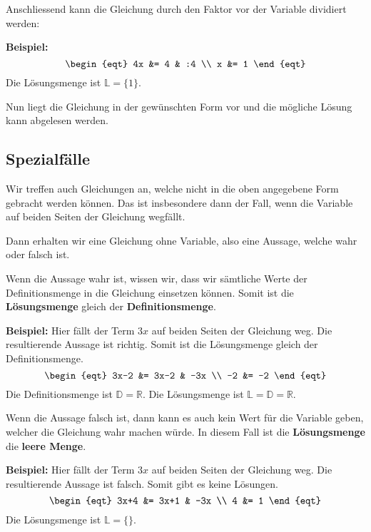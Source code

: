 Anschliessend kann die Gleichung durch den Faktor vor der Variable dividiert werden:

\begin{example}
  \textbf{Beispiel:}
  \[\begin{eqt}
    4x &= 4 & :4 \\
     x &= 1
  \end{eqt}\]
  Die Lösungsmenge ist $\mathbb{L} = \{1\}$.
\end{example}

Nun liegt die Gleichung in der gewünschten Form vor und die mögliche Lösung kann abgelesen werden.

\newpage
\subsection{Spezialfälle}

Wir treffen auch Gleichungen an, welche nicht in die oben angegebene Form gebracht werden können. Das ist insbesondere dann der Fall, wenn die Variable auf beiden Seiten der Gleichung wegfällt.

Dann erhalten wir eine Gleichung ohne Variable, also eine Aussage, welche wahr oder falsch ist.

Wenn die Aussage wahr ist, wissen wir, dass wir sämtliche Werte der Definitionsmenge in die Gleichung einsetzen können. Somit ist die \textbf{Lösungsmenge} gleich der \textbf{Definitionsmenge}.

\begin{example}
  \textbf{Beispiel:} Hier fällt der Term $3x$ auf beiden Seiten der Gleichung weg. Die resultierende Aussage ist richtig. Somit ist die Lösungsmenge gleich der Definitionsmenge.
  \[\begin{eqt}
    3x-2 &= 3x-2 & -3x \\
      -2 &= -2
  \end{eqt}\]
  Die Definitionsmenge ist $\mathbb{D} = \mathbb{R}$. Die Lösungsmenge ist $\mathbb{L} = \mathbb{D} = \mathbb{R}$.
\end{example}

Wenn die Aussage falsch ist, dann kann es auch kein Wert für die Variable geben, welcher die Gleichung wahr machen würde. In diesem Fall ist die \textbf{Lösungsmenge} die \textbf{leere Menge}.

\begin{example}
  \textbf{Beispiel:} Hier fällt der Term $3x$ auf beiden Seiten der Gleichung weg. Die resultierende Aussage ist falsch. Somit gibt es keine Lösungen.
  \[\begin{eqt}
    3x+4 &= 3x+1 & -3x \\
       4 &= 1
  \end{eqt}\]
  Die Lösungsmenge ist $\mathbb{L} = \{\}$.
\end{example}
